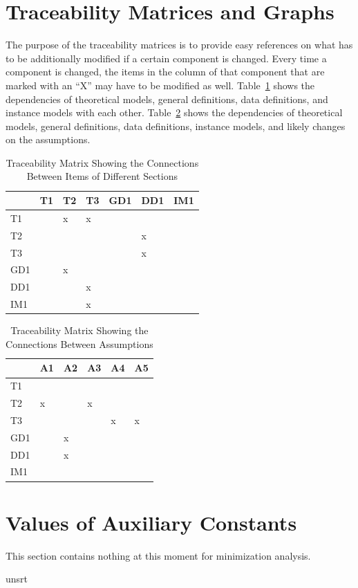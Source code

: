 \documentclass[12pt]{article}
\begin{document}
\section{Traceability Matrices and Graphs}

{The purpose of the traceability matrices is to provide easy references on what
has to be additionally modified if a certain component is changed.  Every time a
component is changed, the items in the column of that component that are marked with an ``X'' may have to be modified as well.  Table~\ref{Table:trace} shows the
dependencies of theoretical models, general definitions, data definitions, and instance models with each other.  Table~\ref{Table:R_trace} shows the dependencies of theoretical models,
general definitions, data definitions, instance models, and likely changes on the assumptions.}


\begin{table}[h!]
    \centering
    \begin{tabular}{|l|l|l|l|l|l|l|}
    \hline
        ~ & T1 & T2 & T3 & GD1 & DD1 & IM1 \\ \hline
        T1 & ~ & x & x & ~ & ~ & ~ \\ \hline
        T2 & ~ & ~ & ~ & ~ & x & ~ \\ \hline
        T3 & ~ & ~ & ~ & ~ & x & ~ \\ \hline
        GD1 & ~ & x & ~ & ~ & ~ & ~ \\ \hline
        DD1 & ~ & ~ & x & ~ & ~ & ~ \\ \hline
        IM1 & ~ & ~ & x & ~ & ~ & ~ \\ \hline
    \end{tabular}

\caption{Traceability Matrix Showing the Connections Between Items of Different Sections}
\label{Table:trace}
\end{table}

\begin{table}[!ht]
    \centering
    \begin{tabular}{|l|l|l|l|l|l|}
    \hline
        ~ & A1 & A2 & A3 & A4 & A5 \\ \hline
        T1 & ~ & ~ & ~ & ~ & ~ \\ \hline
        T2 & x & ~ & x & ~ & ~ \\ \hline
        T3 & ~ & ~ & ~ & x & x \\ \hline
        GD1 & ~ & x & ~ & ~ & ~ \\ \hline
        DD1 & ~ & x & ~ & ~ & ~ \\ \hline
        IM1 & ~ & ~ & ~ & ~ & ~ \\ \hline
    \end{tabular}
\caption{Traceability Matrix Showing the Connections Between Assumptions}
\label{Table:R_trace}
\end{table}

\section{Values of Auxiliary Constants}

This section contains nothing at this moment for minimization analysis.


 {unsrt}

\end{document}
